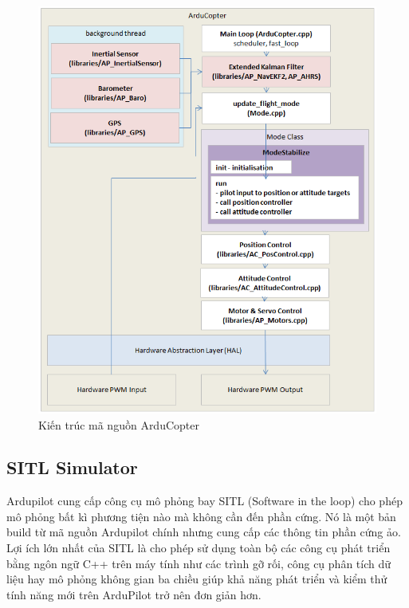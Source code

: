     \begin{figure}[h!]
    	\begin{center}
    		\includegraphics[scale=0.6]{images/copter-architecture.png}
    		\caption{Kiến trúc mã nguồn ArduCopter}
    	\end{center}
    \end{figure}
    
    \subsection{SITL Simulator}
    		Ardupilot cung cấp công cụ mô phỏng bay SITL (Software in the loop) cho phép mô phỏng bất kì phương tiện nào mà không cần đến phần cứng. Nó là một bản build từ mã nguồn Ardupilot chính nhưng cung cấp các thông tin phần cứng ảo. Lợi ích lớn nhất của SITL là cho phép sử dụng toàn bộ các công cụ phát triển bằng ngôn ngữ C++ trên máy tính như các trình gỡ rối, công cụ phân tích dữ liệu hay mô phỏng không gian ba chiều giúp khả năng phát triển và kiểm thử tính năng mới trên ArduPilot trở nên đơn giản hơn. 
    		
